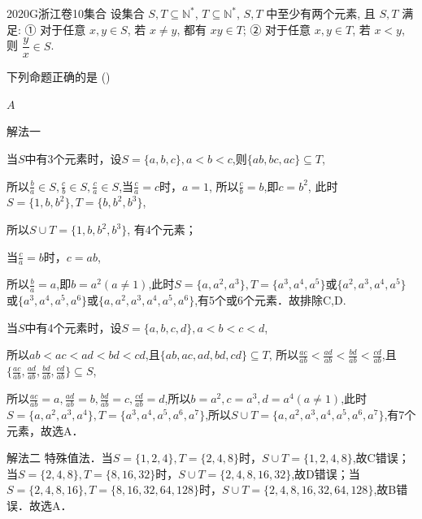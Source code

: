 
\begin{problem}{2020}{G}{浙江卷}{10}{集合}
设集合 $ S,T\subseteq\mathbb{N}^* $, $ T\subseteq\mathbb{N}^* $, $ S,T $ 中至少有两个元素, 且 $ S,T $ 满足:  
① 对于任意 $ x,y\in S $, 若 $ x\neq y $, 都有 $ xy\in T $;  
② 对于任意 $ x,y\in T $, 若 $ x<y $, 则 $ \dfrac{y}{x}\in S $.  

下列命题正确的是 (\hspace{1cm})

\begin{choices}
\end{choices}
\end{problem}

\begin{answer}
$A$
\end{answer}

\begin{solutions}
解法一 

当$S$中有3个元素时，设$S=\{a,b,c\},a<b<c$,则$\{ab,bc,ac\}\subseteq T$,

 所以$\frac{b}{a}\in S,\frac{c}{b}\in S,\frac{c}{a}\in S$,当$\frac{c}{a}=c$时，$a=1$, 所以$\frac{c}{b}=b$,即$c=b^{2}$, 此时$S=\{1,b,b^{2}\},T=\{b,b^{2},b^{3}\}$,

所以$S\cup T=\{1,b,b^{2},b^{3}\}$, 有4个元素；

当$\frac{c}{a}=b$时，$c=ab$,

所以$\frac{b}{a}=a$,即$b=a^{2}(a\neq1)$,此时$S=\{a,a^{2},a^{3}\},T=\{a^{3},a^{4},a^{5}\}$或$\{a^{2},a^{3},a^{4},a^{5}\}$或$\{a^{3},a^{4},a^{5},a^{6}\}$或$\{a,a^{2},a^{3},a^{4},a^{5},a^{6}\}$,有5个或6个元素．故排除C,D.

 当$S$中有4个元素时，设$S=\{a,b,c,d\},a<b<c<d$,

所以$ab<ac<ad<bd<cd$,且$\{ab,ac,ad,bd,cd\}\subseteq T$, 所以$\frac{ac}{ab}<\frac{ad}{ab}<\frac{bd}{ab}<\frac{cd}{ab}$,且$\{\frac{ac}{ab},\frac{ad}{ab},\frac{bd}{ab},\frac{cd}{ab}\}\subseteq S$,

所以$\frac{ac}{ab}=a,\frac{ad}{ab}=b,\frac{bd}{ab}=c,\frac{cd}{ab}=d$,所以$b=a^{2},c=a^{3},d=a^{4}(a\neq1)$,此时$S=\{a,a^{2},a^{3},a^{4}\},T=\{a^{3},a^{4},a^{5},a^{6},a^{7}\}$,所以$S\cup T=\{a,a^{2},a^{3},a^{4},a^{5},a^{6},a^{7}\}$,有7个元素，故选A．

解法二 特殊值法．当$S=\{1,2,4\},T=\{2,4,8\}$时，$S\cup T=\{1,2,4,8\}$,故C错误；当$S=\{2,4,8\},T=\{8,16,32\}$时，$S\cup T=\{2,4,8,16,32\}$,故D错误；当$S=\{2,4,8,16\},T=\{8,16,32,64,128\}$时，$S\cup T=\{2,4,8,16,32,64,128\}$,故B错误．故选A．
\end{solutions}